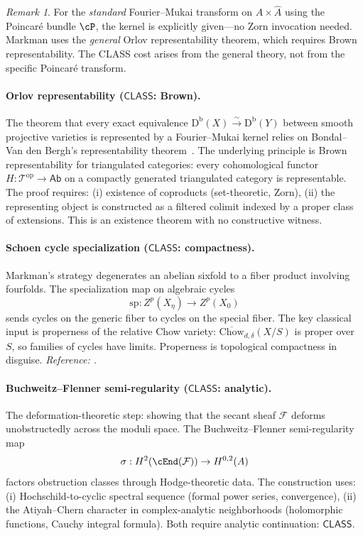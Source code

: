 \documentclass[11pt]{article}
\theoremstyle{plain}
\theoremstyle{definition}
\theoremstyle{remark}
\newtheorem{remark}[theorem]{Remark}
\newcommand{\cF}{\mathcal{F}}
\newcommand{\Db}{\mathrm{D^b}}
\newcommand{\CLASS}{\mathsf{CLASS}}
\begin{document}
\begin{remark}
For the \emph{standard} Fourier--Mukai transform on $A \times
\hat{A}$ using the Poincar\'e bundle $\cP$, the kernel is
explicitly given---no Zorn invocation needed.  Markman uses the
\emph{general} Orlov representability theorem, which requires
Brown representability.  The CLASS cost arises from the general
theory, not from the specific Poincar\'e transform.
\end{remark}

\paragraph{Orlov representability ($\CLASS$: Brown).}
The theorem that every exact equivalence $\Db(X) \xrightarrow{\sim}
\Db(Y)$ between smooth projective varieties is represented by a
Fourier--Mukai kernel relies on Bondal--Van den Bergh's
representability theorem~\cite{bondal-vdb2003}.  The underlying
principle is Brown representability for triangulated categories:
every cohomological functor $H: \mathcal{T}^{\mathrm{op}} \to
\mathsf{Ab}$ on a compactly generated triangulated category is
representable.  The proof requires: (i) existence of coproducts
(set-theoretic, Zorn), (ii) the representing object is constructed as
a filtered colimit indexed by a proper class of extensions.  This is
an existence theorem with no constructive witness.

\paragraph{Schoen cycle specialization ($\CLASS$: compactness).}
Markman's strategy degenerates an abelian sixfold to a fiber product
involving fourfolds.  The specialization map on algebraic cycles
\[
  \mathrm{sp}: Z^p(X_\eta) \to Z^p(X_0)
\]
sends cycles on the generic fiber to cycles on the special fiber.
The key classical input is properness of the relative Chow variety:
$\overline{\mathrm{Chow}}_{d,\delta}(X/S)$ is proper over $S$, so
families of cycles have limits.  Properness is topological
compactness in disguise.  \emph{Reference: \cite{schoen1988}.}

\paragraph{Buchweitz--Flenner semi-regularity ($\CLASS$: analytic).}
The deformation-theoretic step: showing that the secant sheaf
$\cF$ deforms unobstructedly across the moduli space.  The
Buchweitz--Flenner semi-regularity map~\cite{buchweitz-flenner2008}
\[
  \sigma: H^2(\cEnd(\cF)) \to H^{0,2}(A)
\]
factors obstruction classes through Hodge-theoretic data.  The
construction uses: (i) Hochschild-to-cyclic spectral sequence
(formal power series, convergence), (ii) the Atiyah--Chern
character in complex-analytic neighborhoods (holomorphic functions,
Cauchy integral formula).  Both require analytic continuation:
$\CLASS$.
\end{document}
